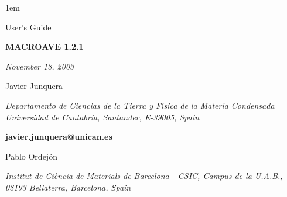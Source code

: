 %
%



\textheight 22cm
\textwidth 16cm
\oddsidemargin 1mm
\topmargin -15mm

\baselineskip=14pt
\parskip 5pt
\parindent 1em




\begin{titlepage}

\begin{center}

\vspace{1cm}

{\huge {\sc User's Guide}}

\vspace{4cm}

{\Huge {\bf MACROAVE 1.2.1} }

\vspace{3cm}

{\Large {\it November 18, 2003} }

\vspace{3cm}

{\Large Javier Junquera}

\vspace{5pt}

{\it Departamento de Ciencias de la Tierra y F\'{\i}sica de
     la Materia Condensada \\
     Universidad de Cantabria, Santander, E-39005, Spain}

\vspace{2pt}
{\bf javier.junquera@unican.es }


\vspace{7mm}

{\Large Pablo Ordej\'on}

\vspace{5pt}

{\it Institut de Ci\`encia de Materials de Barcelona - CSIC,
Campus de la U.A.B.,
08193 Bellaterra, Barcelona, Spain}

\end{center}

\end{titlepage}


